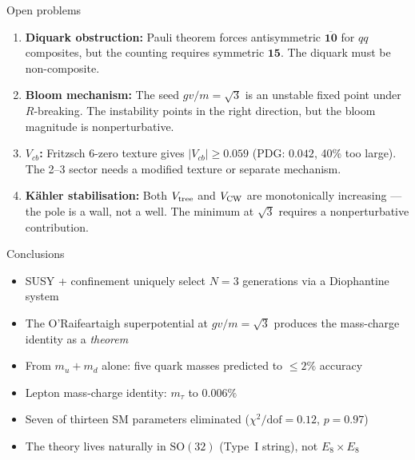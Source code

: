 \documentclass[aspectratio=169,12pt]{beamer}
\begin{document}
\begin{frame}{Open problems}

\begin{enumerate}
\item \textbf{Diquark obstruction:} Pauli theorem forces
antisymmetric $\overline{\mathbf{10}}$ for $qq$ composites,
but the counting requires symmetric $\mathbf{15}$.
The diquark must be non-composite.

\bigskip
\item \textbf{Bloom mechanism:} The seed $gv/m = \sqrt{3}$ is
an unstable fixed point under $R$-breaking. The instability
points in the right direction, but the bloom magnitude is
nonperturbative.

\bigskip
\item \textbf{$V_{cb}$:} Fritzsch 6-zero texture gives
$|V_{cb}| \geq 0.059$ (PDG: $0.042$, 40\% too large).
The 2--3 sector needs a modified texture or separate mechanism.

\bigskip
\item \textbf{K\"ahler stabilisation:} Both $V_{\rm tree}$ and
$V_{\rm CW}$ are monotonically increasing --- the pole is a wall,
not a well. The minimum at $\sqrt{3}$ requires a nonperturbative
contribution.
\end{enumerate}

\end{frame}

\begin{frame}{Conclusions}

\begin{itemize}
\item SUSY + confinement uniquely select $N = 3$ generations
  via a Diophantine system

\bigskip
\item The O'Raifeartaigh superpotential at $gv/m = \sqrt{3}$
  produces the mass-charge identity as a \emph{theorem}

\bigskip
\item From $m_u + m_d$ alone: five quark masses predicted to
  $\leq 2\%$ accuracy

\bigskip
\item Lepton mass-charge identity: $m_\tau$ to $0.006\%$

\bigskip
\item Seven of thirteen SM parameters eliminated
  ($\chi^2/\text{dof} = 0.12$, $p = 0.97$)

\bigskip
\item The theory lives naturally in $\mathrm{SO}(32)$
  (Type~I string), not $E_8 \times E_8$
\end{itemize}

\end{frame}
\end{document}
